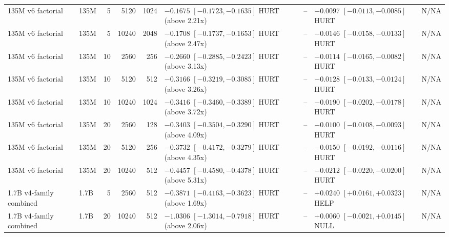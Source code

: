 \begin{landscape}
\begin{ThreePartTable}
\begin{longtable}{@{}p{3.2cm}lrrr p{5.3cm} p{2.0cm} p{5.0cm} c@{}}
135M v6 factorial & 135M & 5 & 5120 & 1024 & $-0.1675$ $[-0.1723,-0.1635]$ HURT (above 2.21x) & -- & $-0.0097$ $[-0.0113,-0.0085]$ HURT & N/NA \\
135M v6 factorial & 135M & 5 & 10240 & 2048 & $-0.1708$ $[-0.1737,-0.1653]$ HURT (above 2.47x) & -- & $-0.0146$ $[-0.0158,-0.0133]$ HURT & N/NA \\
135M v6 factorial & 135M & 10 & 2560 & 256 & $-0.2660$ $[-0.2885,-0.2423]$ HURT (above 3.13x) & -- & $-0.0114$ $[-0.0165,-0.0082]$ HURT & N/NA \\
135M v6 factorial & 135M & 10 & 5120 & 512 & $-0.3166$ $[-0.3219,-0.3085]$ HURT (above 3.26x) & -- & $-0.0128$ $[-0.0133,-0.0124]$ HURT & N/NA \\
135M v6 factorial & 135M & 10 & 10240 & 1024 & $-0.3416$ $[-0.3460,-0.3389]$ HURT (above 3.72x) & -- & $-0.0190$ $[-0.0202,-0.0178]$ HURT & N/NA \\
135M v6 factorial & 135M & 20 & 2560 & 128 & $-0.3403$ $[-0.3504,-0.3290]$ HURT (above 4.09x) & -- & $-0.0100$ $[-0.0108,-0.0093]$ HURT & N/NA \\
135M v6 factorial & 135M & 20 & 5120 & 256 & $-0.3732$ $[-0.4172,-0.3279]$ HURT (above 4.35x) & -- & $-0.0150$ $[-0.0192,-0.0116]$ HURT & N/NA \\
135M v6 factorial & 135M & 20 & 10240 & 512 & $-0.4457$ $[-0.4580,-0.4378]$ HURT (above 5.31x) & -- & $-0.0212$ $[-0.0220,-0.0200]$ HURT & N/NA \\
1.7B v4-family combined & 1.7B & 5 & 2560 & 512 & $-0.3871$ $[-0.4163,-0.3623]$ HURT (above 1.69x) & -- & $+0.0240$ $[+0.0161,+0.0323]$ HELP & N/NA \\
1.7B v4-family combined & 1.7B & 20 & 10240 & 512 & $-1.0306$ $[-1.3014,-0.7918]$ HURT (above 2.06x) & -- & $+0.0060$ $[-0.0021,+0.0145]$ NULL & N/NA \\
\end{longtable}
\end{ThreePartTable}
\endgroup
\end{landscape}

